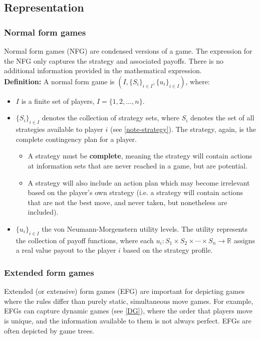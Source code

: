 \documentclass{article}
\begin{document}
\subsection{Representation}

\subsubsection{Normal form games}
Normal form games (NFG) are condensed versions of a game. The expression for the NFG only captures the strategy and associated payoffs. There is no additional information provided in the mathematical expression. \\

\noindent \textbf{Definition:} A normal form game is \((I, \{S_i\}_{i \in I}, \{u_i\}_{i \in I})\), where:
\begin{itemize}
    \item \(I\) is a finite set of players, \(I = \{1, 2, \ldots, n\}\).
    \item \(\{S_i\}_{i \in I}\) denotes the collection of strategy sets, where \(S_i\) denotes the set of all strategies available to player \(i\) (see \ref{note-strategy}). The strategy, again, is the complete contingency plan for a player. 
    \begin{itemize}
        \item A strategy must be \textbf{complete}, meaning the strategy will contain actions at information sets that are never reached in a game, but are potential. 
        \item A strategy will also include an action plan which may become irrelevant based on the player's own strategy (i.e. a strategy will contain actions that are not the best move, and never taken, but nonetheless are included). 
    \end{itemize}
    \item \(\{u_i\}_{i \in I}\) the von Neumann-Morgenstern utility levels. The utility represents the collection of payoff functions, where each $u_i : S_1 \times S_2 \times \cdots \times S_n \to \mathbb{R}$ assigns a real value payout to the player \(i\) based on the strategy profile.
\end{itemize}

\subsubsection{Extended form games}
Extended (or extensive) form games (EFG) are important for depicting games where the rules differ than purely static, simultaneous move games. For example, EFGs can capture dynamic games (see \ref{DG}), where the order that players move is unique, and the information available to them is not always perfect. EFGs are often depicted by game trees.\\
\end{document}
